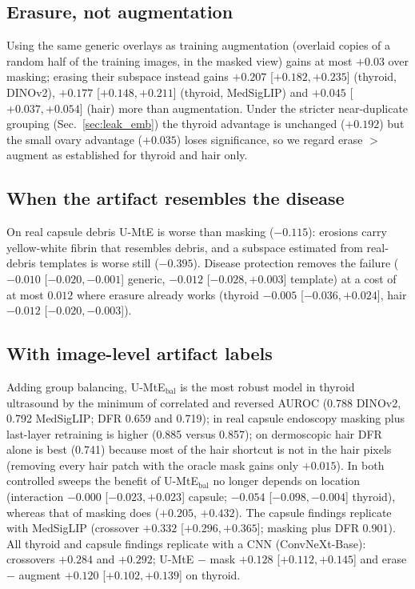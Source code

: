 \subsection{Erasure, not augmentation}
Using the same generic overlays as training augmentation (overlaid copies of a random half of the training images,
in the masked view) gains at most $+0.03$ over masking; erasing their subspace instead gains $+0.207$
[$+0.182, +0.235$] (thyroid, DINOv2), $+0.177$ [$+0.148, +0.211$] (thyroid, MedSigLIP) and $+0.045$
[$+0.037, +0.054$] (hair) more than augmentation. Under the stricter near-duplicate grouping
(Sec.~\ref{sec:leak_emb}) the thyroid advantage is unchanged ($+0.192$) but the small ovary advantage
($+0.035$) loses significance, so we regard erase $>$ augment as established for thyroid and hair only.

\subsection{When the artifact resembles the disease}
On real capsule debris U-MtE is worse than masking ($-0.115$): erosions carry yellow-white fibrin that resembles
debris, and a subspace estimated from real-debris templates is worse still ($-0.395$). Disease protection removes
the failure ($-0.010$ [$-0.020, -0.001$] generic, $-0.012$ [$-0.028, +0.003$] template) at a cost of at most
$0.012$ where erasure already works (thyroid $-0.005$ [$-0.036, +0.024$], hair $-0.012$ [$-0.020, -0.003$]).

\subsection{With image-level artifact labels}
Adding group balancing, U-MtE$_{\text{bal}}$ is the most robust model in thyroid ultrasound by the minimum of
correlated and reversed AUROC (0.788 DINOv2, 0.792 MedSigLIP; DFR 0.659 and 0.719); in real capsule endoscopy
masking plus last-layer retraining is higher (0.885 versus 0.857); on dermoscopic hair DFR alone is best (0.741)
because most of the hair shortcut is not in the hair pixels (removing every hair patch with the oracle mask gains
only $+0.015$). In both controlled sweeps the benefit of U-MtE$_{\text{bal}}$ no longer depends on location
(interaction $-0.000$ [$-0.023, +0.023$] capsule; $-0.054$ [$-0.098, -0.004$] thyroid), whereas that of masking
does ($+0.205$, $+0.432$).
The capsule findings replicate with MedSigLIP (crossover $+0.332$ [$+0.296, +0.365$]; masking plus DFR 0.901).
All thyroid and capsule findings replicate with a CNN (ConvNeXt-Base): crossovers $+0.284$ and $+0.292$; U-MtE $-$ mask $+0.128$ [$+0.112, +0.145$] and erase $-$ augment $+0.120$ [$+0.102, +0.139$] on thyroid.

